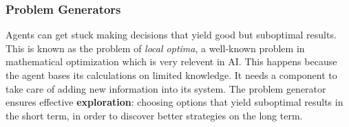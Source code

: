 \subsubsection{Problem Generators}
Agents can get stuck making decisions that yield good but suboptimal results.
This is known as the problem of \emph{local optima}, a well-known problem in mathematical optimization which is very relevent in AI.
This happens because the agent bases its calculations on limited knowledge.
It needs a component to take care of adding new information into its system.
The problem generator ensures effective \textbf{exploration}:
choosing options that yield suboptimal results in the short term, in order to discover better strategies on the long term.

\clearpage  %